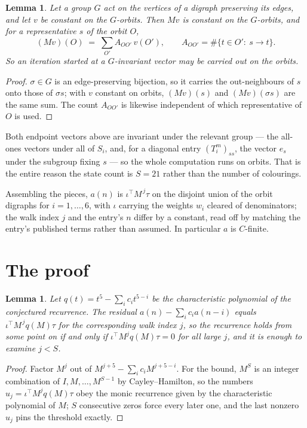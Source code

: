 \documentclass[11pt,a4paper]{article}
\theoremstyle{plain}
\newtheorem{lemma}[theorem]{Lemma}
\theoremstyle{definition}
\begin{document}
\begin{lemma}\label{lem:lump}
Let a group $G$ act on the vertices of a digraph preserving its edges, and let $v$ be constant
on the $G$-orbits. Then $Mv$ is constant on the $G$-orbits, and for a representative $s$ of
the orbit $O$,
\[
(Mv)(O)\;=\;\sum_{O'}A_{OO'}\,v(O'),\qquad
A_{OO'}=\#\{t\in O':\ s\to t\} .
\]
So an iteration started at a $G$-invariant vector may be carried out on the orbits.
\end{lemma}

\begin{proof}
$\sigma\in G$ is an edge-preserving bijection, so it carries the out-neighbours of $s$ onto
those of $\sigma s$; with $v$ constant on orbits, $(Mv)(s)$ and $(Mv)(\sigma s)$ are the same
sum. The count $A_{OO'}$ is likewise independent of which representative of $O$ is used.
\end{proof}

Both endpoint vectors above are invariant under the relevant group --- the all-ones vectors
under all of $S_i$, and, for a diagonal entry $(T_i^m)_{ss}$, the vector $e_s$ under the
subgroup fixing $s$ --- so the whole computation runs on orbits. That is the entire reason the
state count is $S=21$ rather than the number of colourings.

Assembling the pieces, $a(n)$ is $\iota^{\!\top}M^{\,j}\tau$ on the disjoint union of the
orbit digraphs for $i=1,\dots,6$, with $\iota$ carrying the weights $w_i$ cleared of
denominators; the walk index $j$ and the entry's $n$ differ by a constant, read off by
matching the entry's published terms rather than assumed. In particular $a$ is $C$-finite.

\section{The proof}

\begin{lemma}\label{lem:crit}
Let $q(t)=t^{5}-\sum_i c_it^{5-i}$ be the characteristic polynomial of the
conjectured recurrence. The residual $a(n)-\sum_ic_ia(n-i)$ equals
$\iota^{\!\top}M^{\,j}q(M)\tau$ for the corresponding walk index $j$, so the recurrence
holds from some point on if and only if $\iota^{\!\top}M^{j}q(M)\tau=0$ for all large $j$,
and it is enough to examine $j<S$.
\end{lemma}

\begin{proof}
Factor $M^{j}$ out of $M^{j+5}-\sum_ic_iM^{j+5-i}$. For the bound, $M^{S}$
is an integer combination of $I,M,\dots,M^{S-1}$ by Cayley--Hamilton, so the numbers
$u_j=\iota^{\!\top}M^{j}q(M)\tau$ obey the monic recurrence given by the characteristic
polynomial of $M$; $S$ consecutive zeros force every later one, and the last nonzero $u_j$
pins the threshold exactly.
\end{proof}
\end{document}
